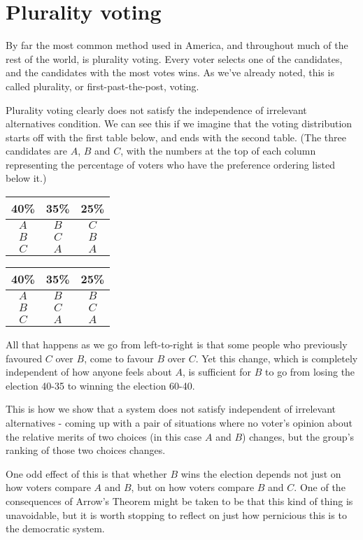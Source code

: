 \documentclass[11pt,]{article}
\begin{document}
\hypertarget{plurality-voting}{%
\section{Plurality voting}\label{plurality-voting}}

By far the most common method used in America, and throughout much of
the rest of the world, is plurality voting. Every voter selects one of
the candidates, and the candidates with the most votes wins. As we've
already noted, this is called plurality, or first-past-the-post, voting.

Plurality voting clearly does not satisfy the independence of irrelevant
alternatives condition. We can see this if we imagine that the voting
distribution starts off with the first table below, and ends with the
second table. (The three candidates are \(A\), \(B\) and \(C\), with the
numbers at the top of each column representing the percentage of voters
who have the preference ordering listed below it.)

\begin{longtable}[]{@{}ccc@{}}
\toprule
40\% & 35\% & 25\%\tabularnewline
\midrule
\endhead
\(A\) & \(B\) & \(C\)\tabularnewline
\(B\) & \(C\) & \(B\)\tabularnewline
\(C\) & \(A\) & \(A\)\tabularnewline
\bottomrule
\end{longtable}

\begin{longtable}[]{@{}ccc@{}}
\toprule
40\% & 35\% & 25\%\tabularnewline
\midrule
\endhead
\(A\) & \(B\) & \(B\)\tabularnewline
\(B\) & \(C\) & \(C\)\tabularnewline
\(C\) & \(A\) & \(A\)\tabularnewline
\bottomrule
\end{longtable}

All that happens as we go from left-to-right is that some people who
previously favoured \(C\) over \(B\), come to favour \(B\) over \(C\).
Yet this change, which is completely independent of how anyone feels
about \(A\), is sufficient for \(B\) to go from losing the election
40-35 to winning the election 60-40.

This is how we show that a system does not satisfy independent of
irrelevant alternatives - coming up with a pair of situations where no
voter's opinion about the relative merits of two choices (in this case
\(A\) and \(B\)) changes, but the group's ranking of those two choices
changes.

One odd effect of this is that whether \(B\) wins the election depends
not just on how voters compare \(A\) and \(B\), but on how voters
compare \(B\) and \(C\). One of the consequences of Arrow's Theorem
might be taken to be that this kind of thing is unavoidable, but it is
worth stopping to reflect on just how pernicious this is to the
democratic system.
\end{document}
